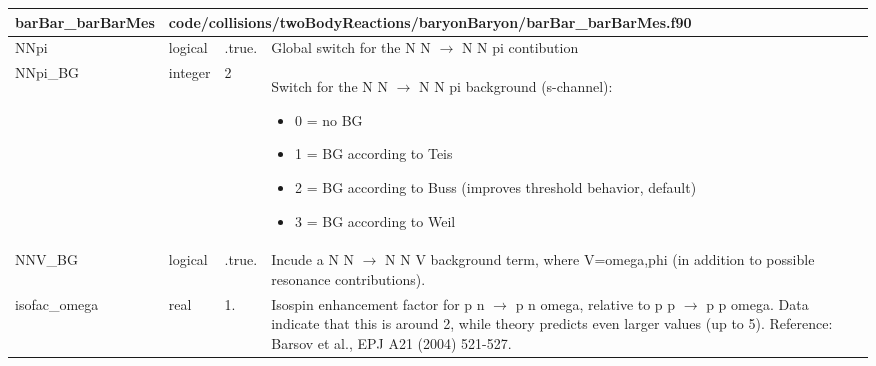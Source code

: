 \documentclass{article}
\begin{document}
\begin{longtable}{llll}
\toprule
\textbf{\large{barBar\_barBarMes}} & \multicolumn{3}{l}{\footnotesize{code/collisions/twoBodyReactions/baryonBaryon/barBar\_barBarMes.f90}}\\*
\midrule
\endfirsthead
\midrule
\endhead
NNpi & \begin{minipage}[t]{2cm}logical\end{minipage} & \begin{minipage}[t]{2cm}.true.\end{minipage} & \begin{minipage}[t]{12cm}Global switch for the N N $\rightarrow$ N N pi contibution\end{minipage}\\*
\midrule
NNpi\_BG & \begin{minipage}[t]{2cm}integer\end{minipage} & \begin{minipage}[t]{2cm}2\end{minipage} & \begin{minipage}[t]{12cm}Switch for the N N $\rightarrow$ N N pi background (s-channel):\begin{itemize}\leftmargin0em\itemindent0pt\item 0 = no BG\item 1 = BG according to Teis\item 2 = BG according to Buss (improves threshold behavior, default)\item 3 = BG according to Weil\end{itemize}\end{minipage}\\*
\midrule
NNV\_BG & \begin{minipage}[t]{2cm}logical\end{minipage} & \begin{minipage}[t]{2cm}.true.\end{minipage} & \begin{minipage}[t]{12cm}Incude a N N $\rightarrow$ N N V background term, where V=omega,phi (in addition to possible resonance contributions).\end{minipage}\\*
\midrule
isofac\_omega & \begin{minipage}[t]{2cm}real\end{minipage} & \begin{minipage}[t]{2cm}1.\end{minipage} & \begin{minipage}[t]{12cm}Isospin enhancement factor for p n $\rightarrow$ p n omega, relative to p p $\rightarrow$ p p omega. Data indicate that this is around 2, while theory predicts even larger values (up to 5). Reference: Barsov et al., EPJ A21 (2004) 521-527.\end{minipage}\\*

\end{longtable}
\end{document}
